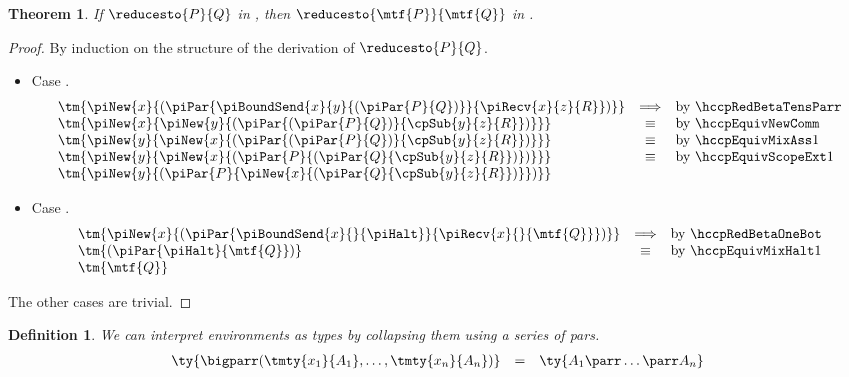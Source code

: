 \documentclass[submission,copyright,creativecommons]{eptcs}
\newtheorem{definition}{Definition}
\newtheorem{theorem}{Theorem}
\begin{document}
\begin{theorem}\label{thm:cp2hcp-reduction}
  If $\reducesto{P}{Q}$ in \cp, then $\reducesto{\mtf{P}}{\mtf{Q}}$ in \hcp.
\end{theorem}
\begin{proof}
  By induction on the structure of the derivation of $\reducesto{P}{Q}$.
  \begin{itemize}
  \item
    Case \cpRedBetaTensParr.
    \begin{gather*}
      \begin{array}{lcl}
        \tm{\piNew{x}{(\piPar{\piBoundSend{x}{y}{(\piPar{P}{Q})}}{\piRecv{x}{z}{R}})}}
        & \Longrightarrow & \text{by \hccpRedBetaTensParr}
        \\
        \tm{\piNew{x}{\piNew{y}{(\piPar{(\piPar{P}{Q})}{\cpSub{y}{z}{R}})}}}
        & \equiv & \text{by \hccpEquivNewComm}
        \\
        \tm{\piNew{y}{\piNew{x}{(\piPar{(\piPar{P}{Q})}{\cpSub{y}{z}{R}})}}}
        & \equiv & \text{by \hccpEquivMixAss1}
        \\
        \tm{\piNew{y}{\piNew{x}{(\piPar{P}{(\piPar{Q}{\cpSub{y}{z}{R}})})}}}
        & \equiv & \text{by \hccpEquivScopeExt1}
        \\
        \tm{\piNew{y}{(\piPar{P}{\piNew{x}{(\piPar{Q}{\cpSub{y}{z}{R}})}})}}
      \end{array}
    \end{gather*}
  \item
    Case \cpRedBetaOneBot.
    \begin{gather*}
      \begin{array}{lcl}
        \tm{\piNew{x}{(\piPar{\piBoundSend{x}{}{\piHalt}}{\piRecv{x}{}{\mtf{Q}}})}}
        & \Longrightarrow & \text{by \hccpRedBetaOneBot}
        \\
        \tm{(\piPar{\piHalt}{\mtf{Q}})}
        & \equiv & \text{by \hccpEquivMixHalt1}
        \\
        \tm{\mtf{Q}}
      \end{array}
    \end{gather*}
  \end{itemize}
  The other cases are trivial.
\end{proof}

\begin{definition}\label{def:bigparr}
  We can interpret environments as types by collapsing them using a series
  of pars.
  \begin{gather*}
    \begin{array}{lcl}
      \ty{\bigparr(\tmty{x_1}{A_1} , \dots , \tmty{x_n}{A_n})}
      & = & \ty{A_1 \parr \dots \parr A_n}
    \end{array}
  \end{gather*}
\end{definition}
\end{document}
